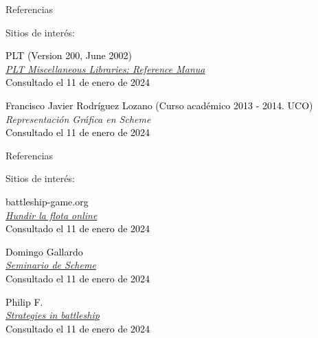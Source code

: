 \begin{frame}{Referencias}
\begin{block}{Sitios de interés:}
\begin{thebibliography}{10}

\textcolor{black}{PLT (Version 200, June 2002)}\\
\emph{\href{https://www.uco.es/users/ma1fegan/Comunes/asignaturas/pd/PLT/Scheme-misclib.pdf}{PLT Miscellaneous Libraries: Reference Manua}}\\
\textcolor{black}{Consultado el 11 de enero de 2024}

\textcolor{black}{Francisco Javier Rodríguez Lozano (Curso académico 2013 - 2014. UCO)}\\
\emph{Representación Gráfica en Scheme}\\
\textcolor{black}{Consultado el 11 de enero de 2024}

\end{thebibliography}
\end{block}
\end{frame}


\begin{frame}{Referencias}
\begin{block}{Sitios de interés:}
\begin{thebibliography}{10}

\textcolor{black}{battleship-game.org}\\
\emph{\href{https://battleship-game.org/}{Hundir la flota online}}\\
\textcolor{black}{Consultado el 11 de enero de 2024}

\textcolor{black}{Domingo Gallardo}\\
\emph{\href{https://domingogallardo.github.io/apuntes-lpp/seminarios/seminario1-scheme/seminario1-scheme.html}{Seminario de Scheme}}\\
\textcolor{black}{Consultado el 11 de enero de 2024}


\textcolor{black}{Philip F.}\\
\emph{\href{https://boardgames.stackexchange.com/questions/56427/strategies-in-battleship}{Strategies in battleship}}\\
\textcolor{black}{Consultado el 11 de enero de 2024}



\end{thebibliography}
\end{block}
\end{frame}


